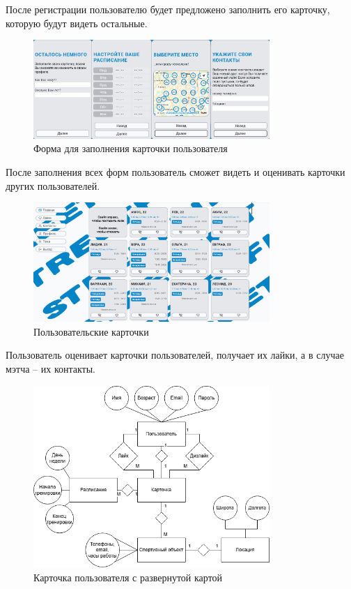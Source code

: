 \documentclass[14pt]{article}
\begin{document}
После регистрации пользователю будет предложено заполнить его карточку, которую будут видеть остальные.

\begin{figure}[H!]
	\centering
	\includegraphics[width=0.8\textwidth]{fig10.png}
	\caption{Форма для заполнения карточки пользователя}
\end{figure}

После заполнения всех форм пользователь сможет видеть и оценивать карточки других пользователей.

\begin{figure}[H!]
	\centering
	\includegraphics[width=0.8\textwidth]{fig11.png}
	\caption{Пользовательские карточки}
\end{figure}

Пользователь оценивает карточки пользователей, получает их лайки, а в случае мэтча – их контакты.

\begin{figure}[H!]
	\centering
	\includegraphics[width=0.8\textwidth]{fig1.png}
	\caption{Карточка пользователя с развернутой картой}
\end{figure}
\end{document}
